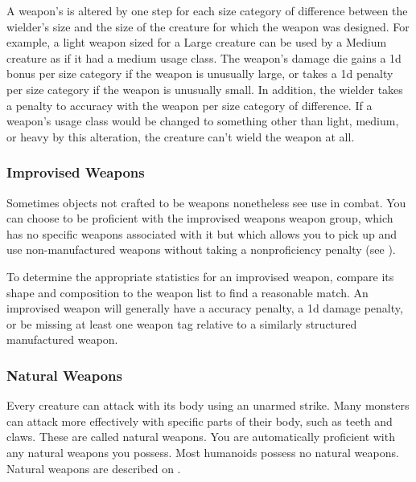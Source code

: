                 \label{Inappropriately Sized Weapons} A weapon's  is altered by one step for each size category of difference between the wielder's size and the size of the creature for which the weapon was designed.
                For example, a light weapon sized for a Large creature can be used by a Medium creature as if it had a medium usage class.
                The weapon's damage die gains a \plus1d bonus per size category if the weapon is unusually large, or takes a \minus1d penalty per size category if the weapon is unusually small.
                In addition, the wielder takes a  penalty to accuracy with the weapon per size category of difference.
                If a weapon's usage class would be changed to something other than light, medium, or heavy by this alteration, the creature can't wield the weapon at all.

        \subsubsection{Improvised Weapons}\label{Improvised Weapons}
            Sometimes objects not crafted to be weapons nonetheless see use in combat.
            You can choose to be proficient with the improvised weapons weapon group, which has no specific weapons associated with it but which allows you to pick up and use non-manufactured weapons without taking a nonproficiency penalty (see ).

            To determine the appropriate statistics for an improvised weapon, compare its shape and composition to the weapon list to find a reasonable match.
            An improvised weapon will generally have a  accuracy penalty, a \minus1d damage penalty, or be missing at least one weapon tag relative to a similarly structured manufactured weapon.

        \subsubsection{Natural Weapons}\label{Natural Weapons}
            Every creature can attack with its body using an unarmed strike. Many monsters can attack more effectively with specific parts of their body, such as teeth and claws. These are called natural weapons. You are automatically proficient with any natural weapons you possess. Most humanoids possess no natural weapons. Natural weapons are described on .

